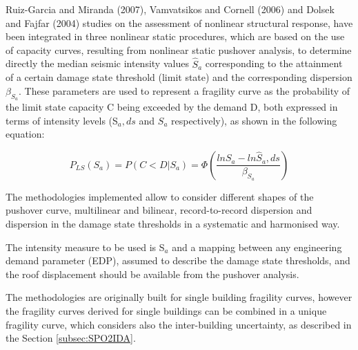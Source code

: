 Ruiz-Garcia and Miranda (2007), Vamvatsikos and Cornell (2006) and Dolsek and Fajfar (2004) studies on the assessment of nonlinear structural response, have been integrated in three nonlinear static procedures, which are based on the use of capacity curves, resulting from nonlinear static pushover analysis, to determine directly the median seismic intensity values $\hat{S}_a$ corresponding to the attainment of a certain damage state threshold (limit state) and the corresponding dispersion $\beta_{S_a}$. These parameters are used to represent a fragility curve as the probability of the limit state capacity C being exceeded by the demand D, both expressed in terms of intensity levels (S$_a, ds$ and $S_a$ respectively), as shown in the following equation:

\begin{equation}
P_{LS}(S_a) = P(C < D | S_a) = \Phi(\frac{ln S_a -ln \hat{S}_a, ds}{\beta_{S_a}})
\label{eq:fragility-definition}
\end{equation}

The methodologies implemented allow to consider different shapes of the pushover curve, multilinear and bilinear, record-to-record dispersion and dispersion in the damage state thresholds in a systematic and harmonised way. 

The intensity measure to be used is S$_a$ and a mapping between any engineering demand parameter (EDP), assumed to describe the damage state thresholds, and the roof displacement should be available from the pushover analysis.

The methodologies are originally built for single building fragility curves, however the fragility curves derived for single buildings can be combined in a unique fragility curve, which considers also the inter-building uncertainty, as described in the Section \ref{subsec:SPO2IDA}.